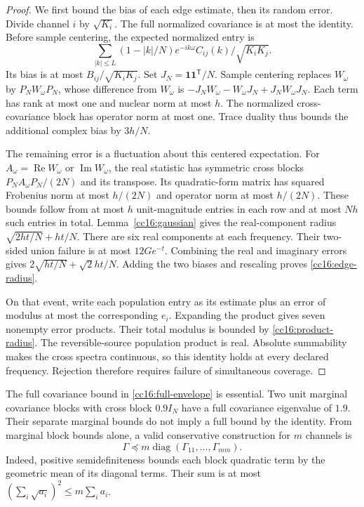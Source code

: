 \begin{proof}
We first bound the bias of each edge estimate, then its random error. Divide channel $i$ by $\sqrt{K_i}$. The full normalized covariance is at most the identity. Before sample centering, the expected normalized entry is
\[
 \sum_{|k|\le L}(1-|k|/N)e^{-ik\omega}
                         C_{ij}(k)/\sqrt{K_iK_j}.
\]
Its bias is at most $B_{ij}/\sqrt{K_iK_j}$. Set $J_N=\mathbf1\mathbf1^{\mathsf T}/N$. Sample centering replaces $W_\omega$ by $P_NW_\omega P_N$, whose difference from $W_\omega$ is
$-J_NW_\omega-W_\omega J_N+J_NW_\omega J_N$.
Each term has rank at most one and nuclear norm at most $h$. The normalized cross-covariance block has operator norm at most one. Trace duality thus bounds the additional complex bias by $3h/N$.

The remaining error is a fluctuation about this centered expectation. For $A_\omega=\operatorname{Re}W_\omega$ or $\operatorname{Im}W_\omega$, the real statistic has symmetric cross blocks $P_NA_\omega P_N/(2N)$ and its transpose. Its quadratic-form matrix has squared Frobenius norm at most $h/(2N)$ and operator norm at most $h/(2N)$. These bounds follow from at most $h$ unit-magnitude entries in each row and at most $Nh$ such entries in total. Lemma~\ref{cc16:gaussian} gives the real-component radius $\sqrt{2ht/N}+ht/N$. There are six real components at each frequency. Their two-sided union failure is at most $12Ge^{-t}$. Combining the real and imaginary errors gives $2\sqrt{ht/N}+\sqrt2ht/N$. Adding the two biases and rescaling proves \eqref{cc16:edge-radius}.

On that event, write each population entry as its estimate plus an error of modulus at most the corresponding $e_i$. Expanding the product gives seven nonempty error products. Their total modulus is bounded by \eqref{cc16:product-radius}. The reversible-source population product is real. Absolute summability makes the cross spectra continuous, so this identity holds at every declared frequency. Rejection therefore requires failure of simultaneous coverage.
\end{proof}

The full covariance bound in \eqref{cc16:full-envelope} is essential. Two unit marginal covariance blocks with cross block $0.9I_N$ have a full covariance eigenvalue of $1.9$. Their separate marginal bounds do not imply a full bound by the identity. From marginal block bounds alone, a valid conservative construction for $m$ channels is
\begin{equation}
 \Gamma\preceq m\operatorname{diag}(\Gamma_{11},\ldots,\Gamma_{mm}).
 \label{cc16:marginal-factor}
\end{equation}
Indeed, positive semidefiniteness bounds each block quadratic term by the geometric mean of its diagonal terms. Their sum is at most $(\sum_i\sqrt{a_i})^2\le m\sum_i a_i$.

